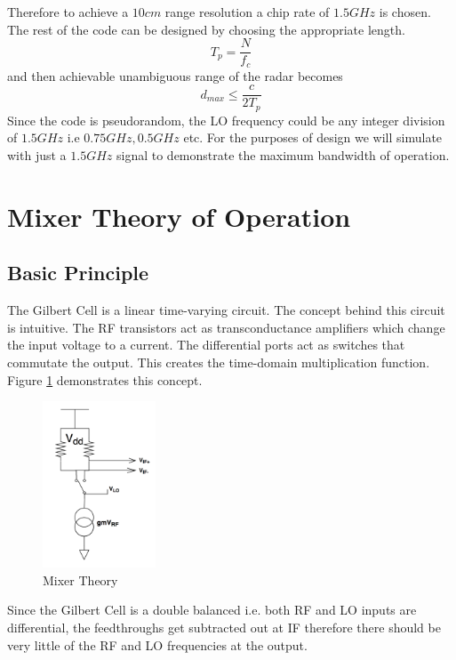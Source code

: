 \documentclass{article}                                                         %
\begin{document}
Therefore to achieve a $10cm$ range resolution a chip rate of $1.5 GHz$ is chosen. The rest of the code can be designed by
choosing the appropriate length. \\
\begin{equation}
  \label{eq:codelength}
  T_{p} = \dfrac{N}{f_c}
\end{equation}
and then achievable unambiguous range of the radar becomes
\begin{equation}
  \label{eq:maxrange}
  d_{max} \leq \dfrac{c}{2T_p}
\end{equation}
Since the code is pseudorandom, the LO frequency could be any integer division of $1.5GHz$ i.e $0.75GHz, 0.5GHz$ etc.
For the purposes of design we will simulate with just a $1.5GHz$ signal to demonstrate the maximum bandwidth of operation.
\newpage
\section{Mixer Theory of Operation}
\subsection{Basic Principle}

The Gilbert Cell is a linear time-varying circuit. The concept behind this circuit is intuitive. The RF transistors act as
transconductance amplifiers which change the input voltage to a current. The differential ports act as switches that commutate the output.
This creates the time-domain multiplication function. Figure \ref{fig:simpmix} demonstrates this concept.
\begin{figure}[H]
  \centering
  \includegraphics[width=0.3\textwidth] {Figures/gilbertSimple}
  \caption{Mixer Theory}
    \label{fig:simpmix}
\end{figure}

Since the Gilbert Cell is a double balanced i.e. both RF and LO inputs are differential, the feedthroughs get subtracted out at IF therefore
there should be very little of the RF and LO frequencies at the output.
\end{document}
